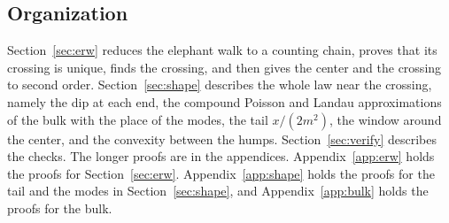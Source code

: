 \subsection{Organization}\label{sec:organization}

Section~\ref{sec:erw} reduces the elephant walk to a counting chain, proves
that its crossing is unique, finds the crossing, and then gives the center
and the crossing to second order. Section~\ref{sec:shape} describes the whole
law near the crossing, namely the dip at each end, the compound Poisson and
Landau approximations of the bulk with the place of the modes, the tail
$x/(2m^2)$, the window around the center, and the convexity between the humps.
Section~\ref{sec:verify} describes the checks. The longer proofs are in
the appendices. Appendix~\ref{app:erw} holds the proofs for
Section~\ref{sec:erw}. Appendix~\ref{app:shape} holds the proofs for the
tail and the modes in Section~\ref{sec:shape}, and Appendix~\ref{app:bulk}
holds the proofs for the bulk.
